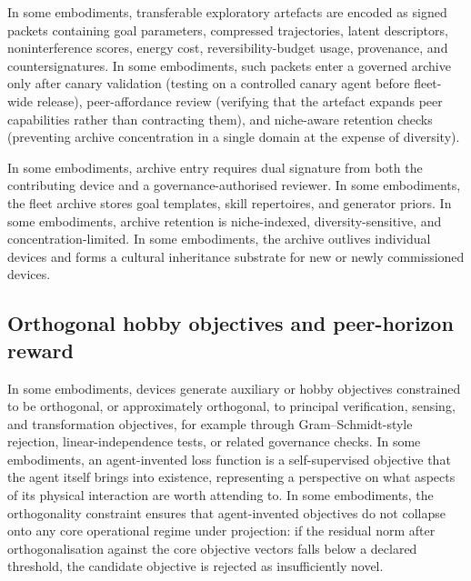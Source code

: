 \documentclass[a4paper,12pt]{article}
\begin{document}
In some embodiments, transferable exploratory artefacts are encoded as
signed packets containing goal parameters, compressed trajectories,
latent descriptors, noninterference scores, energy cost,
reversibility-budget usage, provenance, and countersignatures. In some
embodiments, such packets enter a governed archive only after canary
validation (testing on a controlled canary agent before fleet-wide
release), peer-affordance review (verifying that the artefact expands
peer capabilities rather than contracting them), and niche-aware
retention checks (preventing archive concentration in a single domain
at the expense of diversity).

In some embodiments, archive entry requires dual signature from both
the contributing device and a governance-authorised reviewer. In some
embodiments, the fleet archive stores goal templates, skill
repertoires, and generator priors. In some embodiments, archive
retention is niche-indexed, diversity-sensitive, and
concentration-limited. In some embodiments, the archive outlives
individual devices and forms a cultural inheritance substrate for new
or newly commissioned devices.

\subsection{Orthogonal hobby objectives and peer-horizon reward}


In some embodiments, devices generate auxiliary or hobby objectives
constrained to be orthogonal, or approximately orthogonal, to
principal verification, sensing, and transformation objectives, for
example through Gram--Schmidt-style rejection, linear-independence
tests, or related governance checks. In some embodiments, an
agent-invented loss function is a self-supervised objective that the
agent itself brings into existence, representing a perspective on what
aspects of its physical interaction are worth attending to. In some
embodiments, the orthogonality constraint ensures that agent-invented
objectives do not collapse onto any core operational regime under
projection: if the residual norm after orthogonalisation against the
core objective vectors falls below a declared threshold, the candidate
objective is rejected as insufficiently novel.
\end{document}
